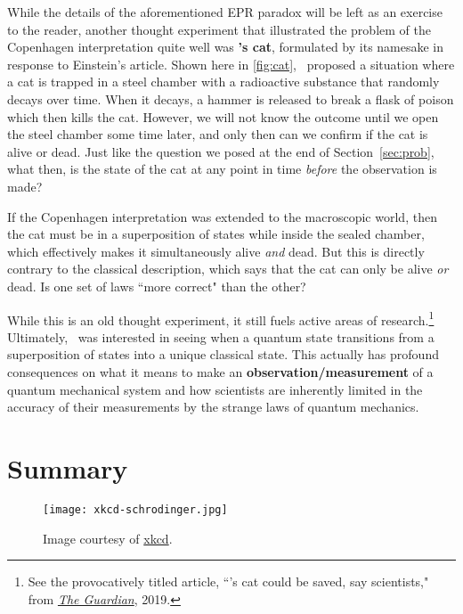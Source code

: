 While the details of the aforementioned EPR paradox will be left as an exercise to the reader, another thought experiment that illustrated the problem of the Copenhagen interpretation quite well was \textbf{\Sch's cat}, formulated by its namesake in response to Einstein's article. 
Shown here in \autoref{fig:cat}, \Sch\ proposed a situation where a cat is trapped in a steel chamber with a radioactive substance that randomly decays over time. 
When it decays, a hammer is released to break a flask of poison which then kills the cat. 
However, we will not know the outcome until we open the steel chamber some time later, and only then can we confirm if the cat is alive or dead. 
Just like the question we posed at the end of Section~\ref{sec:prob}, what then, is the state of the cat at any point in time \emph{before} the observation is made? 

If the Copenhagen interpretation was extended to the macroscopic world, then the cat must be in a superposition of states while inside the sealed chamber, which effectively makes it simultaneously alive \emph{and} dead. 
But this is directly contrary to the classical description, which says that the cat can only be alive \emph{or} dead. 
Is one set of laws ``more correct" than the other? 

While this is an old thought experiment, it still fuels active areas of research.\footnote{See the provocatively titled article, ``\Sch's cat could be saved, say scientists," from \href{https://www.theguardian.com/science/2019/jun/03/feline-fine-fate-of-schrodingers-cat-can-be-reversed-study}{\emph{The Guardian}}, 2019.}
Ultimately, \Sch\ was interested in seeing when a quantum state transitions from a superposition of states into a unique classical state. 
This actually has profound consequences on what it means to make an \textbf{observation/measurement} of a quantum mechanical system and how scientists are inherently limited in the accuracy of their measurements by the strange laws of quantum mechanics.


\section{Summary}

\begin{figure}[!h]
	\centering
	\texttt{[image: xkcd-schrodinger.jpg]}
	\caption{Image courtesy of \href{https://xkcd.com/45/}{xkcd}.}
	\label{fig:xkcd2}
\end{figure}

